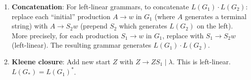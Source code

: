 \begin{enumerate}[{8.}1. ]
\begin{enumerate}
\item \textbf{Concatenation}: For left-linear grammars, to concatenate $L(G_1)\cdot L(G_2)$: replace each ``initial'' production $A \to w$ in $G_1$ (where $A$ generates a terminal string) with $A \to S_2 w$ (prepend $S_2$ which generates $L(G_2)$ on the left). More precisely, for each production $S_1 \to w$ in $G_1$, replace with $S_1 \to S_2 w$ (left-linear). The resulting grammar generates $L(G_1) \cdot L(G_2)$.

\item \textbf{Kleene closure}: Add new start $Z$ with $Z \to ZS_1 \mid \lambda$. This is left-linear. $L(G_*) = L(G_1)^*$.
\end{enumerate}

\end{enumerate}
